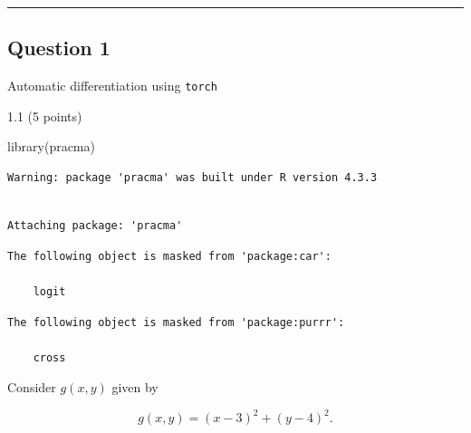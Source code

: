 \documentclass[
  letterpaper,
  DIV=11,
  numbers=noendperiod]{scrartcl}
\newenvironment{Shaded}{\begin{snugshade}}{\end{snugshade}}
\newcommand{\FunctionTok}[1]{\textcolor[rgb]{0.28,0.35,0.67}{#1}}
\newcommand{\NormalTok}[1]{\textcolor[rgb]{0.00,0.23,0.31}{#1}}
\begin{document}
\begin{center}\rule{0.5\linewidth}{0.5pt}\end{center}

\hypertarget{question-1}{%
\subsection{Question 1}\label{question-1}}

\begin{tcolorbox}[enhanced jigsaw, leftrule=.75mm, left=2mm, coltitle=black, rightrule=.15mm, titlerule=0mm, colbacktitle=quarto-callout-tip-color!10!white, toprule=.15mm, bottomrule=.15mm, opacityback=0, arc=.35mm, colframe=quarto-callout-tip-color-frame, title=\textcolor{quarto-callout-tip-color}{\faLightbulb}\hspace{0.5em}{30 points}, opacitybacktitle=0.6, toptitle=1mm, breakable, bottomtitle=1mm, colback=white]

Automatic differentiation using \texttt{torch}

\end{tcolorbox}

1.1 (5 points)

\begin{Shaded}
\begin{Highlighting}[]
\FunctionTok{library}\NormalTok{(pracma)}
\end{Highlighting}
\end{Shaded}

\begin{verbatim}
Warning: package 'pracma' was built under R version 4.3.3
\end{verbatim}

\begin{verbatim}

Attaching package: 'pracma'
\end{verbatim}

\begin{verbatim}
The following object is masked from 'package:car':

    logit
\end{verbatim}

\begin{verbatim}
The following object is masked from 'package:purrr':

    cross
\end{verbatim}

Consider \(g(x, y)\) given by

\[
g(x, y) = (x - 3)^2 + (y - 4)^2.
\]
\end{document}
